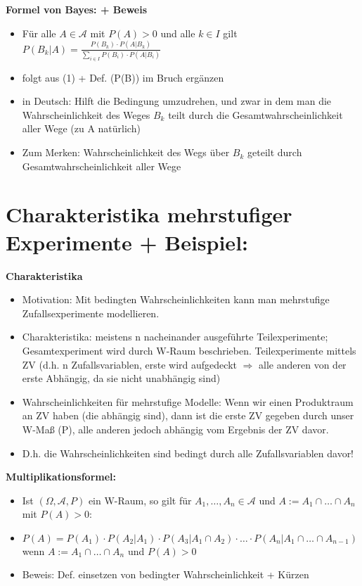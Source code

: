 \documentclass[a4paper,11pt]{scrartcl}
\begin{document}
\textbf{Formel von Bayes: + Beweis}
\begin{itemize}
    \item Für alle $ A \in \mathcal{A}$ mit $P(A) > 0$ und alle $k \in I$ gilt
    $P(B_k|A) = \frac{P(B_k) \cdot P(A|B_k)}{\sum_{i \in I} P(B_i) \cdot P(A|B_i)}$
    \item folgt aus (1) + Def. (P(B)) im Bruch ergänzen
    \item in Deutsch: Hilft die Bedingung umzudrehen, und zwar in dem man die Wahrscheinlichkeit des Weges $B_k$ teilt durch die Gesamtwahrscheinlichkeit aller Wege (zu A natürlich)
    \item Zum Merken: Wahrscheinlichkeit des Wegs über $B_k$ geteilt durch Gesamtwahrscheinlichkeit aller Wege
\end{itemize}


\section{Charakteristika mehrstufiger Experimente + Beispiel:}

\textbf{Charakteristika}

\begin{itemize}
    \item Motivation: Mit bedingten Wahrscheinlichkeiten kann man mehrstufige Zufallsexperimente modellieren.
    \item Charakteristika: meistens n nacheinander ausgeführte Teilexperimente; Gesamtexperiment wird durch W-Raum beschrieben. Teilexperimente mittels ZV (d.h. n Zufallsvariablen, erste wird aufgedeckt $\Rightarrow$ alle anderen von der erste Abhängig, da sie nicht unabhängig sind)
    \item Wahrscheinlichkeiten für mehrstufige Modelle: Wenn wir einen Produktraum an ZV haben (die abhängig sind), dann ist die erste ZV gegeben durch unser W-Maß (P), alle anderen jedoch abhängig vom Ergebnis der ZV davor.
    \item D.h. die Wahrscheinlichkeiten sind bedingt durch alle Zufallsvariablen davor!
\end{itemize}

\textbf{Multiplikationsformel:}
\begin{itemize}
    \item Ist $(\Omega, \mathcal{A}, P)$ ein W-Raum, so gilt für $A_1, \dots, A_n \in \mathcal{A}$ und $A := A_1 \cap \dots \cap A_n$ mit $P(A) >0:$
    \item $P(A) = P(A_1) \cdot P(A_2|A_1) \cdot P(A_3|A_1 \cap A_2) \cdot \dots \cdot P(A_n|A_1 \cap \dots \cap A_{n-1}) $ wenn $A:= A_1 \cap \dots \cap A_n$ und $P(A) >0$
    \item Beweis: Def. einsetzen von bedingter Wahrscheinlichkeit + Kürzen
\end{itemize}
\end{document}

